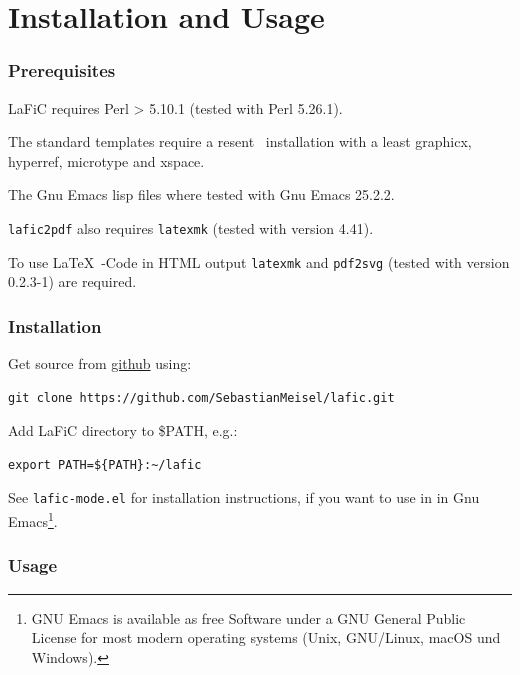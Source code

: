 \documentclass{article}
\begin{document}
\part{Installation and Usage}

\section{Prerequisites}

{LaFiC requires Perl > 5.10.1 (tested with Perl 5.26.1).\\}

{The standard templates require a resent \XeLaTeX\  installation
with a least graphicx, hyperref, microtype and xspace.\\}

{The Gnu Emacs lisp files where tested with Gnu Emacs 25.2.2.\\}

{\texttt{lafic2pdf} also requires \texttt{latexmk} (tested with version 4.41).\\}

{To use \LaTeX\ -Code in HTML output \texttt{latexmk} and \texttt{pdf2svg} (tested
with version 0.2.3-1) are required.\\}

\section{Installation}
\label{installation}

{Get source from \href{https://github.com/SebastianMeisel/lafics}{github} using:\\}

\begin{verbatim}
git clone https://github.com/SebastianMeisel/lafic.git
\end{verbatim}


{Add LaFiC directory to \$PATH, e.g.:\\}

\begin{verbatim}
export PATH=${PATH}:~/lafic
\end{verbatim}


{See \texttt{lafic-mode.el} for installation instructions, if you want
to use in in Gnu Emacs\footnote{GNU Emacs is available as free Software under a GNU General Public License for most modern operating systems (Unix, GNU/Linux, macOS und Windows).}\xspace .\\}

\section{Usage}
\end{document}
